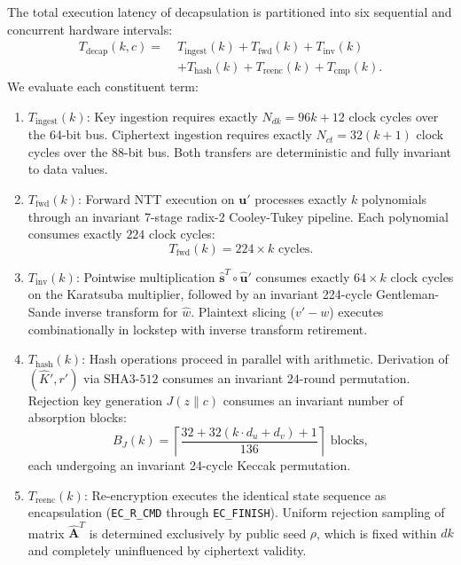 \vspace{0.2cm}
\begin{IEEEproof}
The total execution latency of decapsulation is partitioned into six sequential and concurrent hardware intervals:
\begin{equation}
\label{eq:decap_intervals}
\begin{aligned}
T_{\text{decap}}(k, c) = \; &T_{\text{ingest}}(k) + T_{\text{fwd}}(k) + T_{\text{inv}}(k) \\
&+ T_{\text{hash}}(k) + T_{\text{reenc}}(k) + T_{\text{cmp}}(k).
\end{aligned}
\end{equation}
We evaluate each constituent term:
\begin{enumerate}
    \item $T_{\text{ingest}}(k)$: Key ingestion requires exactly $N_{dk} = 96k + 12$ clock cycles over the 64-bit bus. Ciphertext ingestion requires exactly $N_{ct} = 32(k + 1)$ clock cycles over the 88-bit bus. Both transfers are deterministic and fully invariant to data values.
    \item $T_{\text{fwd}}(k)$: Forward NTT execution on $\mathbf{u}'$ processes exactly $k$ polynomials through an invariant 7-stage radix-2 Cooley-Tukey pipeline. Each polynomial consumes exactly $224$ clock cycles:
    \begin{equation}
    T_{\text{fwd}}(k) = 224 \times k\text{ cycles}.
    \end{equation}
    \item $T_{\text{inv}}(k)$: Pointwise multiplication $\hat{\mathbf{s}}^T \circ \hat{\mathbf{u}}'$ consumes exactly $64 \times k$ clock cycles on the Karatsuba multiplier, followed by an invariant 224-cycle Gentleman-Sande inverse transform for $\hat{w}$. Plaintext slicing ($v' - w$) executes combinationally in lockstep with inverse transform retirement.
    \item $T_{\text{hash}}(k)$: Hash operations proceed in parallel with arithmetic. Derivation of $(\hat{K}', r')$ via $\text{SHA3-512}$ consumes an invariant $24$-round permutation. Rejection key generation $J(z \parallel c)$ consumes an invariant number of absorption blocks:
    \begin{equation}
    B_J(k) = \left\lceil \frac{32 + 32(k \cdot d_u + d_v) + 1}{136} \right\rceil \text{ blocks},
    \end{equation}
    each undergoing an invariant 24-cycle Keccak permutation.
    \item $T_{\text{reenc}}(k)$: Re-encryption executes the identical state sequence as encapsulation (\texttt{EC\_R\_CMD} through \texttt{EC\_FINISH}). Uniform rejection sampling of matrix $\hat{\mathbf{A}}^T$ is determined exclusively by public seed $\rho$, which is fixed within $dk$ and completely uninfluenced by ciphertext validity.

\end{enumerate}
\end{IEEEproof}
